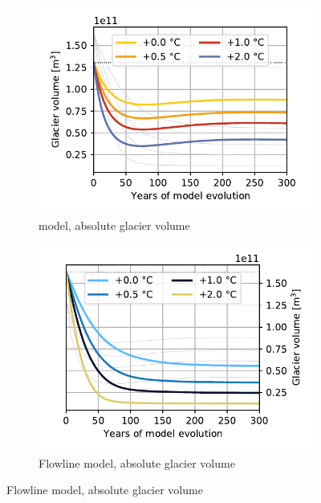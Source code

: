 \begin{figure}[htp]
\begin{subfigure}[b]{0.48\textwidth}
      \end{subfigure}
      \begin{subfigure}[b]{0.48\textwidth}
        \caption{\Vas{} model, absolute glacier volume}
        \label{fig:histalp_projection:volume_abs_const}
        \centering
        \includegraphics[width=\textwidth]{../plots/final_plots/time_series/histalp_projection/volume_abs_vas.pdf}
      \end{subfigure}
      \hfill
      \begin{subfigure}[b]{0.48\textwidth}
        \caption{Flowline model, absolute glacier volume}
        \label{fig:histalp_projection:volume_abs_random}
        \centering
        \includegraphics[width=\textwidth]{../plots/final_plots/time_series/histalp_projection/volume_abs_fl.pdf}
      \end{subfigure}
      

\end{figure}
